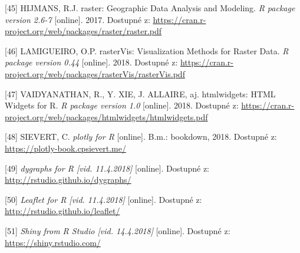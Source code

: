 \documentclass[12pt,]{article}
\begin{document}
\hypertarget{ref-raster}{}
{[}45{]} HIJMANS, R.J. raster: Geographic Data Analysis and Modeling.
\emph{R package version 2.6-7} {[}online{]}. 2017. Dostupné z:
\url{https://cran.r-project.org/web/packages/raster/raster.pdf}

\hypertarget{ref-rasterVis}{}
{[}46{]} LAMIGUEIRO, O.P. rasterVis: Visualization Methods for Raster
Data. \emph{R package version 0.44} {[}online{]}. 2018. Dostupné z:
\url{https://cran.r-project.org/web/packages/rasterVis/rasterVis.pdf}

\hypertarget{ref-htmlwidgets}{}
{[}47{]} VAIDYANATHAN, R., Y. XIE, J. ALLAIRE, aj. htmlwidgets: HTML
Widgets for R. \emph{R package version 1.0} {[}online{]}. 2018. Dostupné
z:
\url{https://cran.r-project.org/web/packages/htmlwidgets/htmlwidgets.pdf}

\hypertarget{ref-plotly}{}
{[}48{]} SIEVERT, C. \emph{plotly for R} {[}online{]}. B.m.: bookdown,
2018. Dostupné z: \url{https://plotly-book.cpsievert.me/}

\hypertarget{ref-dygraphs}{}
{[}49{]} \emph{dygraphs for R {[}vid. 11.4.2018{]}} {[}online{]}.
Dostupné z: \url{http://rstudio.github.io/dygraphs/}

\hypertarget{ref-leaflet}{}
{[}50{]} \emph{Leaflet for R {[}vid. 11.4.2018{]}} {[}online{]}.
Dostupné z: \url{http://rstudio.github.io/leaflet/}

\hypertarget{ref-shiny}{}
{[}51{]} \emph{Shiny from R Studio {[}vid. 14.4.2018{]}} {[}online{]}.
Dostupné z: \url{https://shiny.rstudio.com/}
\end{document}
